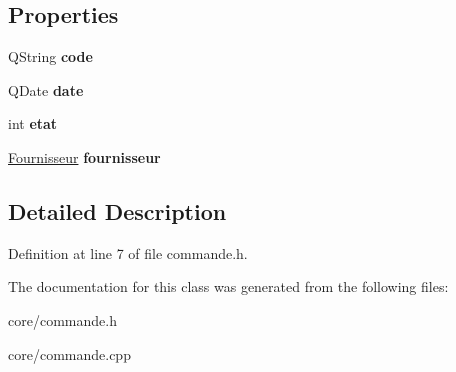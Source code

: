 \subsection*{Properties}
\begin{DoxyCompactItemize}
\item 
\hypertarget{class_commande_a2ecb8ace957493fa223e1e768e85bda7}{
QString {\bfseries code}}
\label{class_commande_a2ecb8ace957493fa223e1e768e85bda7}

\item 
\hypertarget{class_commande_a15b8137e1c75757be341481e8668449f}{
QDate {\bfseries date}}
\label{class_commande_a15b8137e1c75757be341481e8668449f}

\item 
\hypertarget{class_commande_a5794dadb5575bae3350d8cfd60b17400}{
int {\bfseries etat}}
\label{class_commande_a5794dadb5575bae3350d8cfd60b17400}

\item 
\hypertarget{class_commande_a4d64d1201bc40fb954d208384388b21e}{
\hyperlink{class_fournisseur}{Fournisseur} {\bfseries fournisseur}}
\label{class_commande_a4d64d1201bc40fb954d208384388b21e}

\end{DoxyCompactItemize}


\subsection{Detailed Description}


Definition at line 7 of file commande.h.



The documentation for this class was generated from the following files:\begin{DoxyCompactItemize}
\item 
core/commande.h\item 
core/commande.cpp\end{DoxyCompactItemize}
